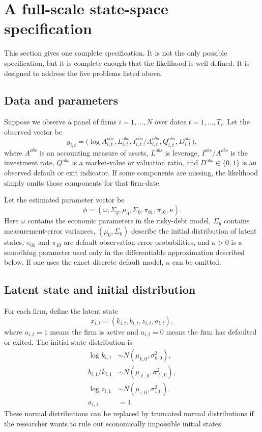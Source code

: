 \documentclass[11pt]{article}
\newcommand{\1}{\mathbf{1}}
\begin{document}
\section{A full-scale state-space specification}
\label{sec:full-scale-ssm}

This section gives one complete specification. It is not the only possible
specification, but it is complete enough that the likelihood is well defined.
It is designed to address the five problems listed above.

\subsection{Data and parameters}

Suppose we observe a panel of firms \(i=1,\ldots,N\) over dates
\(t=1,\ldots,T_i\). Let the observed vector be
\[
  y_{i,t}
  =
  \bigl(
    \log A_{i,t}^{obs},
    L_{i,t}^{obs},
    I_{i,t}^{obs}/A_{i,t}^{obs},
    Q_{i,t}^{obs},
    D_{i,t}^{obs}
  \bigr),
\]
where \(A^{obs}\) is an accounting measure of assets, \(L^{obs}\) is leverage,
\(I^{obs}/A^{obs}\) is the investment rate, \(Q^{obs}\) is a market-value or
valuation ratio, and \(D^{obs}\in\{0,1\}\) is an observed default or exit
indicator. If some components are missing, the likelihood simply omits those
components for that firm-date.

Let the estimated parameter vector be
\[
  \phi=(\omega,\Sigma_y,\mu_0,\Sigma_0,\pi_{01},\pi_{10},\kappa).
\]
Here \(\omega\) contains the economic parameters in the risky-debt model,
\(\Sigma_y\) contains measurement-error variances, \((\mu_0,\Sigma_0)\)
describe the initial distribution of latent states, \(\pi_{01}\) and
\(\pi_{10}\) are default-observation error probabilities, and \(\kappa>0\) is a
smoothing parameter used only in the differentiable approximation described
below. If one uses the exact discrete default model, \(\kappa\) can be omitted.

\subsection{Latent state and initial distribution}

For each firm, define the latent state
\[
  x_{i,t}=(k_{i,t},b_{i,t},z_{i,t},a_{i,t}),
\]
where \(a_{i,t}=1\) means the firm is active and \(a_{i,t}=0\) means the firm
has defaulted or exited. The initial state distribution is
\begin{align}
  \log k_{i,1} &\sim N(\mu_{k,0},\sigma_{k,0}^2),\\
  b_{i,1}/k_{i,1} &\sim N(\mu_{\ell,0},\sigma_{\ell,0}^2),\\
  \log z_{i,1} &\sim N(\mu_{z,0},\sigma_{z,0}^2),\\
  a_{i,1} &= 1.
\end{align}
These normal distributions can be replaced by truncated normal distributions
if the researcher wants to rule out economically impossible initial states.
\end{document}
